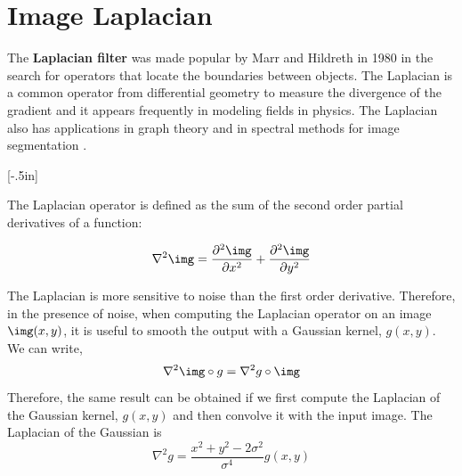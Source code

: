 


\section{Image Laplacian}

The {\bf Laplacian filter}
was made popular by Marr and Hildreth in 1980 \cite{Marr80} in the search for operators that locate the boundaries between objects. The Laplacian is a common operator from differential geometry to measure the divergence of the gradient and it appears frequently in modeling fields in physics. 
The Laplacian also has applications in graph theory and in spectral methods for image segmentation \cite{ng2002}.

[-.5in]

The  Laplacian operator is defined as the sum of the second order partial derivatives of a function:

\begin{equation}
\nabla^2 \img = \frac{\partial^2 \img}{\partial x^2} + \frac{\partial^2 \img}{\partial y^2} 
\end{equation}

The Laplacian is more sensitive to noise than the first order derivative. Therefore, in the presence of noise,  when computing the Laplacian operator on an image $\img(x,y)$, it is useful to smooth the output with a Gaussian kernel, $g(x,y)$. We can write,
\begin{equation}
\nabla^2 \img \circ g = \nabla^2 g \circ \img
\end{equation}
Therefore, the same result can be obtained if we first compute the Laplacian of the Gaussian kernel, $g(x,y)$ and then convolve it with the input image. The Laplacian of the Gaussian is
\begin{equation}
\nabla^2 g = \frac{x^2 + y^2 -2\sigma^2}{\sigma^4} g(x,y) 
\end{equation}


